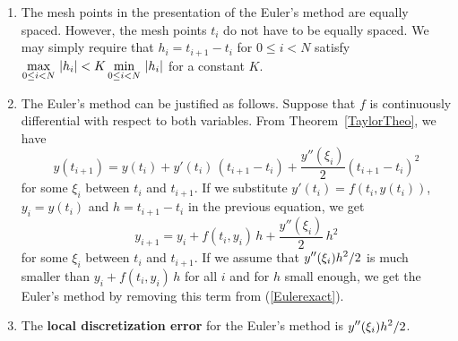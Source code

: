 \begin{rmkList}
\begin{enumerate}
\item The mesh points in the presentation of the Euler's method are
equally spaced.  However, the mesh points $t_i$ do not have to be 
equally spaced.  We may simply require that $h_i = t_{i+1} - t_i$ for
$0\leq i < N$ satisfy
$\displaystyle \max_{0\leq i <N}\,|h_i| < K \min_{0\leq i <N}\,|h_i|$
for a constant $K$.
\item The Euler's method can be justified as follows.  Suppose that $f$
is continuously differential with respect to both variables.
From Theorem~\ref{TaylorTheo}, we have
\[
y(t_{i+1}) = y(t_i) + y'(t_i)\,(t_{i+1} -t_i) +
\frac{y''(\xi_i)}{2}\left(t_{i+1} - t_i\right)^2
\]
for some $\xi_i$ between $t_i$ and $t_{i+1}$.  If we substitute
$y'(t_i) = f(t_i,y(t_i))$, $y_i= y(t_i)$ and $h=t_{i+1}-t_i$ in
the previous equation, we get
\begin{equation} \label{Eulerexact}
y_{i+1} = y_i + f(t_i,y_i)\,h + \frac{y''(\xi_i)}{2}\,h^2
\end{equation}
for some $\xi_i$ between $t_i$ and $t_{i+1}$.  If we assume that
$\displaystyle y''(\xi_i)h^2/2$ is much smaller than
$y_i + f(t_i,y_i)\,h$ for all
$i$ and for $h$ small enough, we get the Euler's method by removing this
term from (\ref{Eulerexact}).
\item The
{\bfseries local discretization error} for the Euler's method is $\displaystyle y''(\xi_i)h^2/2$.
\end{enumerate}
\end{rmkList}

